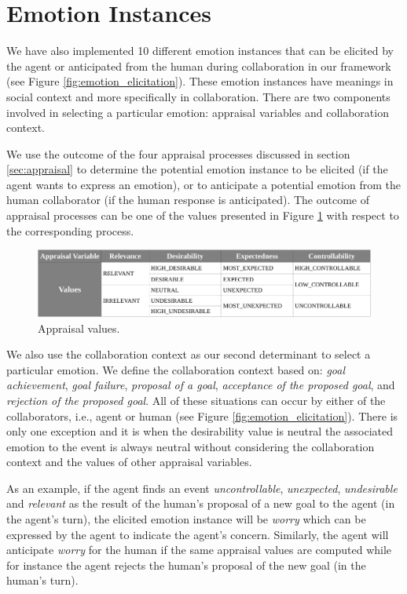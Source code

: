 \documentclass[12pt]{report}
\begin{document}
\section{Emotion Instances}
We have also implemented 10 different emotion instances that can be elicited by
the agent or anticipated from the human during collaboration in our framework
(see Figure \ref{fig:emotion_elicitation}). These emotion instances have
meanings in social context and more specifically in collaboration. There are two
components involved in selecting a particular emotion: appraisal variables and
collaboration context.

We use the outcome of the four appraisal processes discussed in section
\ref{sec:appraisal} to determine the potential emotion instance to be elicited
(if the agent wants to express an emotion), or to anticipate a potential emotion
from the human collaborator (if the human response is anticipated). The outcome
of appraisal processes can be one of the values presented in Figure
\ref{fig:appraisal_values} with respect to the corresponding process.

\begin{figure}[tbh]
  \centering
  \includegraphics[width=1\textwidth]{figure/apraisal_values_croped.pdf}
  \caption{Appraisal values.}
  \label{fig:appraisal_values}
\end{figure}

We also use the collaboration context as our second determinant to select a
particular emotion. We define the collaboration context based on: \textit{goal
achievement}, \textit{goal failure}, \textit{proposal of a goal},
\textit{acceptance of the proposed goal}, and \textit{rejection of the proposed
goal}. All of these situations can occur by either of the collaborators, i.e.,
agent or human (see Figure \ref{fig:emotion_elicitation}). There is only one
exception and it is when the desirability value is neutral the associated
emotion to the event is always neutral without considering the collaboration
context and the values of other appraisal variables.

As an example, if the agent finds an event \textit{uncontrollable},
\textit{unexpected}, \textit{undesirable} and \textit{relevant} as the result of
the human's proposal of a new goal to the agent (in the agent's turn), the
elicited emotion instance will be \textit{worry} which can be expressed by the agent to
indicate the agent's concern. Similarly, the agent will anticipate
\textit{worry} for the human if the same appraisal values are computed while for
instance the agent rejects the human's proposal of the new goal (in the human's
turn).
\end{document}
